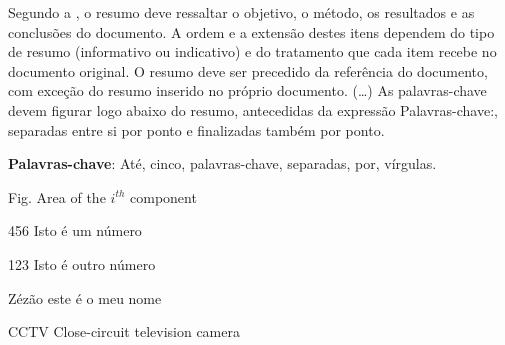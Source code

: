 \documentclass[12pt, %
openright, 
oneside, %
a4paper,    %
brazil]{facom-ufu-abntex2}
\begin{document}





\begin{resumo} %
 Segundo a , o resumo deve ressaltar o
 objetivo, o método, os resultados e as conclusões do documento. A ordem e a extensão
 destes itens dependem do tipo de resumo (informativo ou indicativo) e do
 tratamento que cada item recebe no documento original. O resumo deve ser
 precedido da referência do documento, com exceção do resumo inserido no
 próprio documento. (\ldots) As palavras-chave devem figurar logo abaixo do
 resumo, antecedidas da expressão Palavras-chave:, separadas entre si por
 ponto e finalizadas também por ponto.

 \vspace{\onelineskip}
    
 \noindent
 \textbf{Palavras-chave}: Até, cinco, palavras-chave, separadas, por, vírgulas. %
\end{resumo}

\listoffigures*
\cleardoublepage

\listoftables*
\cleardoublepage



\begin{siglas} %
  \item[Fig.] Area of the $i^{th}$ component
  \item[456] Isto é um número
  \item[123] Isto é outro número
  \item[Zézão] este é o meu nome
  \item[CCTV] Close-circuit television camera 
\end{siglas}
\end{document}
